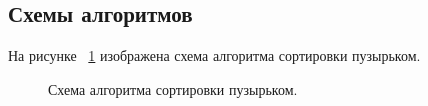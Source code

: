 \documentclass[a4paper]{article}
\begin{document}
	\subsection{Схемы алгоритмов}
	На рисунке ~\ref{image1} изображена схема алгоритма сортировки пузырьком.
	 \begin{figure}[h]
		\caption{Схема алгоритма сортировки пузырьком. \centering}
		\label{image1}
	\end{figure}
	\clearpage
	
\end{document}
